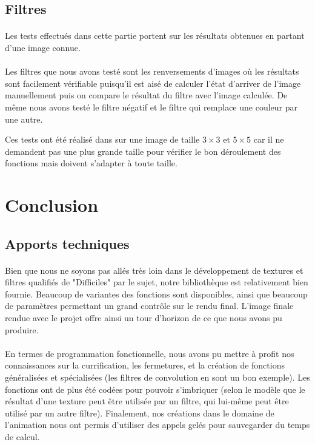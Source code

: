 \documentclass[a4paper]{article}
\begin{document}
\subsection{Filtres}
\paragraph{}
Les tests effectués dans cette partie portent sur les résultats obtenues en partant d'une image connue.

\paragraph{}
Les filtres que nous avons testé sont les renversements d'images où les résultats sont facilement vérifiable puisqu'il est aisé de calculer l'état d'arriver de l'image manuellement puis on compare le résultat du filtre avec l'image calculée. De même nous avons testé le filtre négatif et le filtre qui remplace une couleur par une autre.

Ces tests ont été réalisé dans sur une image de taille $3 \times 3$ et $5 \times 5$ car il ne demandent pas une plus grande taille pour vérifier le bon déroulement des fonctions mais doivent s'adapter à toute taille.

\section{Conclusion}

\subsection{Apports techniques}
\label{sec:technic}

\paragraph{}
Bien que nous ne soyons pas allés très loin dans le développement de textures et filtres qualifiés de "Difficiles" par le sujet, notre bibliothèque est relativement bien fournie. Beaucoup de variantes des fonctions sont disponibles, ainsi que beaucoup de paramètres permettant un grand contrôle sur le rendu final. L'image finale rendue avec le projet offre ainsi un tour d'horizon de ce que nous avons pu produire.

\paragraph{}
En termes de programmation fonctionnelle, nous avons pu mettre à profit nos connaissances sur la currification, les fermetures, et la création de fonctions généralisées et spécialisées (les filtres de convolution en sont un bon exemple). Les fonctions ont de plus été codées pour pouvoir s'imbriquer (selon le modèle que le résultat d'une texture peut être utilisée par un filtre, qui lui-même peut être utilisé par un autre filtre). Finalement, nos créations dans le domaine de l'animation nous ont permis d'utiliser des appels gelés pour sauvegarder du temps de calcul.
\end{document}

